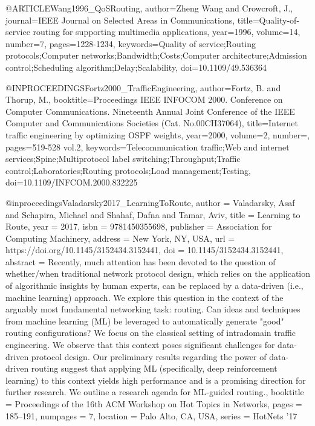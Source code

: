 @ARTICLE{Wang1996_QoSRouting,
  author={Zheng Wang and Crowcroft, J.},
  journal={IEEE Journal on Selected Areas in Communications}, 
  title={{Quality-of-service routing for supporting multimedia applications}}, 
  year={1996},
  volume={14},
  number={7},
  pages={1228-1234},
  keywords={Quality of service;Routing protocols;Computer networks;Bandwidth;Costs;Computer architecture;Admission control;Scheduling algorithm;Delay;Scalability},
  doi={10.1109/49.536364}}


@INPROCEEDINGS{Fortz2000_TrafficEngineering,
  author={Fortz, B. and Thorup, M.},
  booktitle={Proceedings IEEE INFOCOM 2000. Conference on Computer Communications. Nineteenth Annual Joint Conference of the IEEE Computer and Communications Societies (Cat. No.00CH37064)}, 
  title={{Internet traffic engineering by optimizing OSPF weights}}, 
  year={2000},
  volume={2},
  number={},
  pages={519-528 vol.2},
  keywords={Telecommunication traffic;Web and internet services;Spine;Multiprotocol label switching;Throughput;Traffic control;Laboratories;Routing protocols;Load management;Testing},
  doi={10.1109/INFCOM.2000.832225}}



@inproceedings{Valadarsky2017_LearningToRoute,
author = {Valadarsky, Asaf and Schapira, Michael and Shahaf, Dafna and Tamar, Aviv},
title = {{Learning to Route}},
year = {2017},
isbn = {9781450355698},
publisher = {Association for Computing Machinery},
address = {New York, NY, USA},
url = {https://doi.org/10.1145/3152434.3152441},
doi = {10.1145/3152434.3152441},
abstract = {Recently, much attention has been devoted to the question of whether/when traditional network protocol design, which relies on the application of algorithmic insights by human experts, can be replaced by a data-driven (i.e., machine learning) approach. We explore this question in the context of the arguably most fundamental networking task: routing. Can ideas and techniques from machine learning (ML) be leveraged to automatically generate "good" routing configurations? We focus on the classical setting of intradomain traffic engineering. We observe that this context poses significant challenges for data-driven protocol design. Our preliminary results regarding the power of data-driven routing suggest that applying ML (specifically, deep reinforcement learning) to this context yields high performance and is a promising direction for further research. We outline a research agenda for ML-guided routing.},
booktitle = {Proceedings of the 16th ACM Workshop on Hot Topics in Networks},
pages = {185–191},
numpages = {7},
location = {Palo Alto, CA, USA},
series = {HotNets '17}
}

